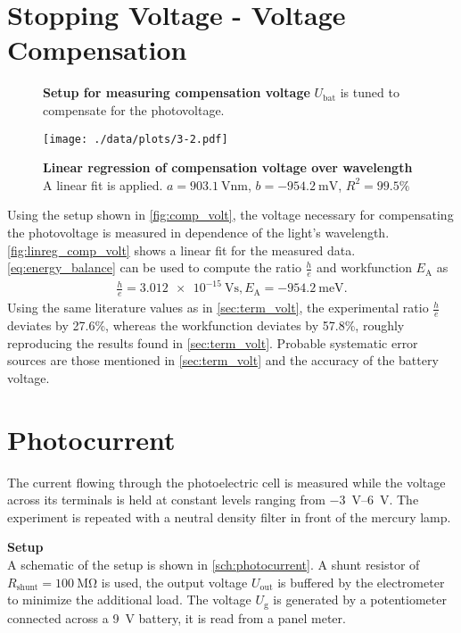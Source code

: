 \section{Stopping Voltage - Voltage Compensation}%
\begin{figure}[tbp]
	\centering
	\caption[Setup for measuring compensation voltage]{\textbf{Setup for measuring compensation voltage} $U_\text{bat}$ is tuned to compensate for the photovoltage.}
	\label{fig:comp_volt}
\end{figure}
\begin{figure}[tbp]
	\centering
	\texttt{[image: ./data/plots/3-2.pdf]}
	\caption[Linear regression of compensation voltage over wavelength]{\textbf{Linear regression of compensation voltage over wavelength} A linear fit is applied. $a=\SI{903.1}{\volt\nm}$, $b=\SI{-954.2}{\milli\V}$, $R^2=99.5\%$}
	\label{fig:linreg_comp_volt}
\end{figure}
Using the setup shown in \autoref{fig:comp_volt}, the voltage necessary for compensating the photovoltage is measured in dependence of the light's wavelength.
\autoref{fig:linreg_comp_volt} shows a linear fit for the measured data.
\autoref{eq:energy_balance} can be used to compute the ratio $\frac{h}{e}$ and workfunction $E_\text{A}$ as
\begin{gather*}
	\frac{h}{e}=\SI{3.012e-15}{\volt\second}, E_\text{A}=\SI{-954.2}{\milli\eV}.
\end{gather*}
Using the same literature values as in \autoref{sec:term_volt}, the experimental ratio $\frac{h}{e}$ deviates by \num{27.6}\%, whereas the workfunction deviates by \num{57.8}\%, roughly reproducing the results found in \autoref{sec:term_volt}.
Probable systematic error sources are those mentioned in \autoref{sec:term_volt} and the accuracy of the battery voltage.

\section{Photocurrent}\label{sec:photo_current}%

The current flowing through the photoelectric cell is measured while the voltage across its terminals is held at constant levels ranging from \SIrange{-3}{6}{\volt}.
The experiment is repeated with a neutral density filter in front of the mercury lamp.

\textbf{Setup}\\
A schematic of the setup is shown in \autoref{sch:photocurrent}.
A shunt resistor of $R_\text{shunt} = \SI{100}{\mega\ohm}$ is used, the output voltage $U_\text{out}$ is buffered by the electrometer to minimize the additional load.
The voltage $U_\text{g}$ is generated by a potentiometer connected across a \SI{9}{\volt} battery, it is read from a panel meter.

